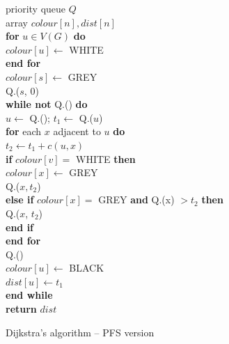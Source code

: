 \begin{figure}
\label{fig:dijkstra-alg2}

{
priority queue $Q$ \\

array $colour[n], dist[n]$ \\

\textbf{for} $u\in V(G)$ \textbf{do} \\

\> $colour[u] \gets$ WHITE  \\

\textbf{end for} \\

$colour[s] \gets $ GREY \\

Q.($s$, $0$) \\

\textbf{while not} Q.() \textbf{do} \\

\> $u \gets $ Q.(); $t_1 \gets$  Q.($u$) \\

\> \textbf{for} each $x$ adjacent to $u$ \textbf{do} \\

\> \> $t_2 \gets t_1 + c(u, x)$ \\

\> \>  \textbf{if} $colour[v] = $ WHITE \textbf{then} \\

\> \> \> $colour[x] \gets $ GREY \\

\> \> \> Q.($x, t_2$) \\

\> \> \textbf{else if} $colour[x] = $ GREY \textbf{and} Q.(x) $ > t_2$ \textbf{then} \\

\> \> \> Q.($x$, $t_2$) \\

\> \> \textbf{end if} \\

\> \textbf{end for} \\

\> Q.() \\

\> $colour[u] \gets $ BLACK \\

\> $dist[u] \gets t_1$ \\

\textbf{end while} \\

\textbf{return} $dist$\\
}

\caption{Dijkstra's algorithm -- PFS version}
\end{figure}


